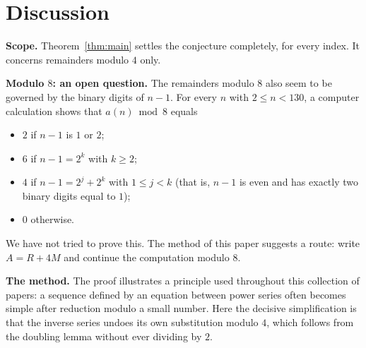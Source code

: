 \documentclass[11pt,a4paper]{article}
\theoremstyle{definition}
\theoremstyle{remark}
\newcommand{\para}[1]{\par\medskip\noindent\textbf{#1}\enspace}
\begin{document}
\section{Discussion}\label{sec:discussion}

\para{Scope.} Theorem~\ref{thm:main} settles the conjecture completely, for every index. It concerns remainders modulo
$4$ only.

\para{Modulo $8$: an open question.} The remainders modulo $8$ also seem to be governed by the binary digits of $n-1$.
For every $n$ with $2\le n<130$, a computer calculation shows that $a(n)\bmod 8$ equals
\begin{itemize}
\item $2$ if $n-1$ is $1$ or $2$;
\item $6$ if $n-1=2^k$ with $k\ge2$;
\item $4$ if $n-1=2^j+2^k$ with $1\le j<k$ (that is, $n-1$ is even and has exactly two binary digits equal to $1$);
\item $0$ otherwise.
\end{itemize}
We have not tried to prove this. The method of this paper suggests a route: write $A=R+4M$ and continue the computation
modulo $8$.

\para{The method.} The proof illustrates a principle used throughout this collection of papers: a sequence defined by an
equation between power series often becomes simple after reduction modulo a small number. Here the decisive
simplification is that the inverse series undoes its own substitution modulo $4$, which follows from the doubling lemma
without ever dividing by $2$.
\end{document}
